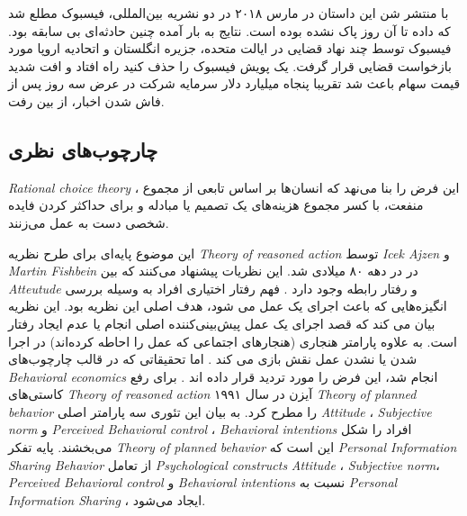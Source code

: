  با منتشر شن این داستان در مارس ۲۰۱۸ در دو نشریه بین‌المللی، فیسبوک
 مطلع شد که داده تا آن روز پاک نشده بوده است. نتایج به بار آمده
 چنین حادثه‌ای بی سابقه بود. فیسبوک توسط چند نهاد قضایی در ایالت متحده، 
 جزیره انگلستان و اتحادیه اروپا مورد بازخواست قضایی قرار گرفت. یک پویش
 فیسبوک را حذف کنید راه افتاد و افت شدید قیمت سهام باعث شد تقریبا پنجاه میلیارد دلار
 سرمایه شرکت در عرض سه روز پس از فاش شدن اخبار، از بین رفت.




\subsection{چارچوب‌های نظری}
\textit{
  \gls{Rational choice theory}
}
،
این فرض را بنا می‌نهد که انسان‌ها بر اساس
تابعی از مجموع منفعت، با کسر مجموع هزینه‌های یک تصمیم
یا مبادله و برای حداکثر کردن فایده  شخصی دست به عمل می‌زنند.

این موضوع پایه‌ای برای طرح نظریه
\textit{
  \gls{Theory of reasoned action}
}
توسط
\textit{
  \gls{Icek Ajzen}
}
و
\textit{
  \gls{Martin Fishbein}
}
در در دهه ۸۰ میلادی شد. این نظریات پیشنهاد می‌کنند که بین
\textit{
  \gls{Atteutude}
}
و رفتار رابطه وجود دارد
.
فهم رفتار اختیاری افراد به وسیله
بررسی انگیزه‌هایی که باعث اجرای یک عمل می شود، هدف اصلی این نظریه بود. این نظریه
بیان می کند که قصد اجرای یک عمل پیش‌بینی‌کننده اصلی انجام یا عدم ایجاد رفتار  است. به
علاوه پارامتر هنجاری
(هنجارهای اجتماعی که عمل را احاطه کرده‌اند)
در اجرا شدن یا نشدن عمل نقش بازی می کند
.
اما تحقیقاتی که در قالب چارچوب‌های
\textit{
  \gls{Behavioral economics}
}
انجام شد، این فرض را مورد تردید قرار داده اند
\!\cite{henrichEconomicManCrosscultural2005}.
برای رفع کاستی‌های
\textit{
  \gls{Theory of reasoned action}
}
آیزن در سال ۱۹۹۱ 
\!\citep{ajzenTheoryPlannedBehavior1991}
\textit{
  \gls{Theory of planned behavior}
}
را مطرح کرد. به بیان این تئوری سه پارامتر اصلی
\textit{
  \gls{Attitude}
}
\!،
\textit{\gls{Subjective norm}}
و
\textit{\gls{Perceived Behavioral control}}
\!،
\textit{\glspl{Behavioral intention}}
افراد را شکل می‌بخشند. پایه تفکر
\textit{
  \gls{Theory of planned behavior}
}
این است که
\textit{
  \gls{Personal Information Sharing Behavior}
}
از تعامل
\textit{\glspl{Psychological construct}}
\textit{
  \gls{Attitude}
}
\!،
\textit{\gls{Subjective norm}}،
\textit{\gls{Perceived Behavioral control}}
و
\textit{\glspl{Behavioral intention}}
نسبت به 
\textit{
  \gls{Personal Information Sharing}
}،
ایجاد می‌شود. 


